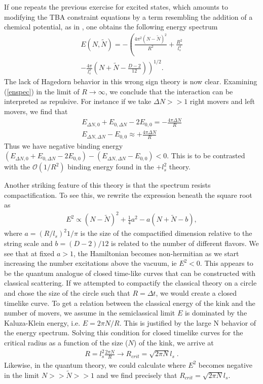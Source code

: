 \documentclass[%
 reprint,
 amsmath,amssymb,
 aps,
]{revtex4-1}
\begin{document}
If one repeats the previous exercise for excited states, which amounts to modifying the TBA
constraint equations by a term resembling the addition of a chemical potential, as in
\cite{Dubovsky:2012wk}, one obtains the following energy spectrum
\begin{eqnarray}
    \label{enspec}
    E(N,\tilde{N}) = -\left( \frac{4 \pi^2 (N - \tilde{N})^2}{R^2} + \frac{R^2}{l_s^4} \right .
    \nonumber \\ \left . -\frac{4 \pi}{l_s^2} \left( N + \tilde{N} - \frac{D-2}{12} \right)
    \right)^{1/2} .
\end{eqnarray}
The lack of Hagedorn behavior in this wrong sign theory is now clear. Examining (\ref{enspec}) in
the limit of $R\to\infty$, we conclude that the interaction can be interpreted as repulsive. For
instance if we take $\Delta N >> 1$ right movers and left movers, we find that
\begin{eqnarray}
   E_{\Delta N,0}+E_{0,\Delta N}-2E_{0,0} = -\frac{4\pi \Delta N}{R}  \nonumber \\
   E_{\Delta N,\Delta N} - E_{0,0} \approx +\frac{4\pi \Delta N}{R} \nonumber
\end{eqnarray}
Thus we have negative binding energy $ (E_{\Delta N,0}+E_{0,\Delta N}-2E_{0,0})-(E_{\Delta N,\Delta
N} - E_{0,0} )<0 $. This is to be contrasted with the $\mathcal{O}(1/R^2)$ binding energy found in
the $+l_{s}^{2}$ theory.

Another striking feature of this theory is that the spectrum resists compactification. To see this,
we rewrite the expression beneath the square root as
\begin{eqnarray}
    E^2 \propto \left( N - \tilde{N} \right)^2 + \frac{1}{4} a^2 - a \left( N + \tilde{N} - b \right)
    \nonumber ,
\end{eqnarray}
where $a = \left( R / l_s \right)^2 1 / \pi $ is the size of the compactified dimension relative to
the string scale and $ b = (D-2)/12 $ is related to the number of different flavors. We see that at
fixed $a>1$, the Hamiltonian becomes non-hermitian as we start increasing the number excitations
above the vacuum, ie $E^2 < 0$. This appears to be the quantum analogue of closed time-like curves
that can be constructed with classical scattering. If we attempted to compactify the classical
theory on a circle and chose the size of the circle such that $R = \Delta t$, we would create a
closed timelike curve.  To get a relation between the classical energy of the kink and the number of
movers, we assume in the semiclassical limit $E$ is dominated by the Kaluza-Klein energy, i.e. $E =
2 \pi N / R $.  This is justified by the large N behavior of the energy spectrum.  Solving this
condition for closed
timelike curves for the critical radius as a function of the size ($N$) of the kink, we arrive at
\begin{eqnarray}
    R = l_s^2 \frac{2 \pi N}{R} \rightarrow R_{crit} = \sqrt{2 \pi N} l_s \; . \nonumber
\end{eqnarray}
Likewise, in the quantum theory, we could calculate where $E^2$ becomes negative in the limit $N >>
\tilde{N} >> 1$ and we find precisely that $R_{crit} = \sqrt{2 \pi N} l_s$.
\end{document}
